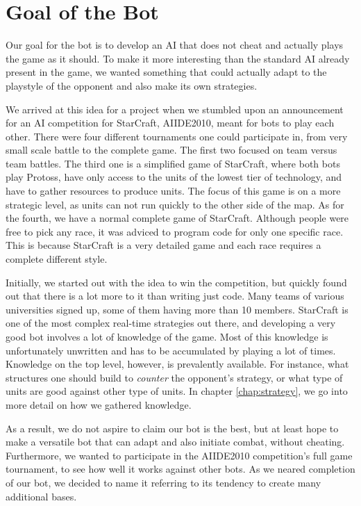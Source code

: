 \section{Goal of the Bot}
Our goal for the bot is to develop an AI that does not cheat and actually plays the game as it should. To make it more interesting than the standard AI already present in the game, we wanted something that could actually adapt to the playstyle of the opponent and also make its own strategies.

We arrived at this idea for a project when we stumbled upon an announcement for an AI competition for StarCraft, AIIDE2010, meant for bots to play each other. There were four different tournaments one could participate in, from very small scale battle to the complete game. The first two focused on team versus team battles. The third one is a simplified game of StarCraft, where both bots play Protoss, have only access to the units of the lowest tier of technology, and have to gather resources to produce units. The focus of this game is on a more strategic level, as units can not run quickly to the other side of the map. As for the fourth, we have a normal complete game of StarCraft. Although people were free to pick any race, it was adviced to program code for only one specific race. This is because StarCraft is a very detailed game and each race requires a complete different style.

Initially, we started out with the idea to win the competition, but quickly found out that there is a lot more to it than writing just code. Many teams of various universities signed up, some of them having more than 10 members. StarCraft is one of the most complex real-time strategies out there, and developing a very good bot involves a lot of knowledge of the game. Most of this knowledge is unfortunately unwritten and has to be accumulated by playing a lot of times. Knowledge on the top level, however, is prevalently available. For instance, what structures one should build to \emph{counter} the opponent's strategy, or what type of units are good against other type of units. In chapter \ref{chap:strategy}, we go into more detail on how we gathered knowledge.

As a result, we do not aspire to claim our bot is the best, but at least hope to make a versatile bot that can adapt and also initiate combat, without cheating. Furthermore, we wanted to participate in the AIIDE2010 competition's full game tournament, to see how well it works against other bots. As we neared completion of our bot, we decided to name it \massexpand{} referring to its tendency to create many additional bases.


